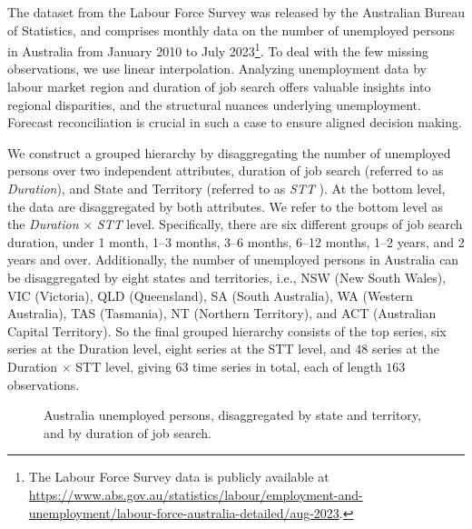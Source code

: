 \documentclass[
  11pt]{article}
\theoremstyle{plain}
\theoremstyle{remark}
\begin{document}
The dataset from the Labour Force Survey was released by the Australian
Bureau of Statistics, and comprises monthly data on the number of
unemployed persons in Australia from January 2010 to July
2023\footnote{The Labour Force Survey data is publicly available at
  \url{https://www.abs.gov.au/statistics/labour/employment-and-unemployment/labour-force-australia-detailed/aug-2023}.}.
To deal with the few missing observations, we use linear interpolation.
Analyzing unemployment data by labour market region and duration of job
search offers valuable insights into regional disparities, and the
structural nuances underlying unemployment. Forecast reconciliation is
crucial in such a case to ensure aligned decision making.

We construct a grouped hierarchy by disaggregating the number of
unemployed persons over two independent attributes, duration of job
search (referred to as \emph{Duration}), and State and Territory
(referred to as \emph{STT} ). At the bottom level, the data are
disaggregated by both attributes. We refer to the bottom level as the
\emph{Duration} \(\times\) \emph{STT} level. Specifically, there are six
different groups of job search duration, under 1 month, 1--3 months,
3--6 months, 6--12 months, 1--2 years, and 2 years and over.
Additionally, the number of unemployed persons in Australia can be
disaggregated by eight states and territories, i.e., NSW (New South
Wales), VIC (Victoria), QLD (Queensland), SA (South Australia), WA
(Western Australia), TAS (Tasmania), NT (Northern Territory), and ACT
(Australian Capital Territory). So the final grouped hierarchy consists
of the top series, six series at the Duration level, eight series at the
STT level, and \(48\) series at the Duration \(\times\) STT level,
giving \(63\) time series in total, each of length \(163\) observations.

\begin{figure}[!t]


\caption{\label{fig-labour-data}Australia unemployed persons,
disaggregated by state and territory, and by duration of job search.}

\end{figure}%
\end{document}

